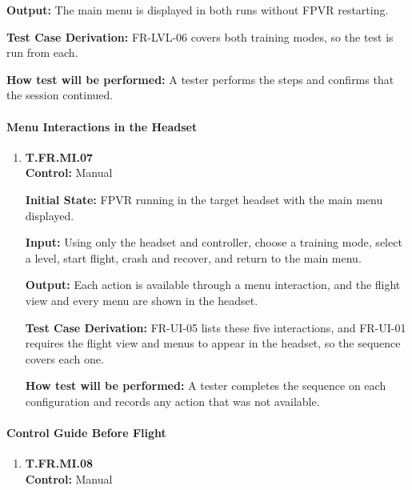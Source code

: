 \documentclass[12pt, titlepage]{article}
\begin{document}
{\begin{enumerate}
\textbf{Output:} The main menu is displayed in both runs without FPVR restarting.

\textbf{Test Case Derivation:} \mbox{FR-LVL-06} covers both training modes, so the test
is run from each.

\textbf{How test will be performed:} A tester performs the steps and confirms that the
session continued.

\end{enumerate}

\paragraph{Menu Interactions in the Headset}

\begin{enumerate}

\item{\hypertarget{test-fr-mi-07}{}\textbf{T.FR.MI.07}\\}
\textbf{Control:} Manual

\textbf{Initial State:} FPVR running in the target headset with the main menu displayed.

\textbf{Input:} Using only the headset and controller, choose a training mode, select a
level, start flight, crash and recover, and return to the main menu.

\textbf{Output:} Each action is available through a menu interaction, and the flight
view and every menu are shown in the headset.

\textbf{Test Case Derivation:} \mbox{FR-UI-05} lists these five interactions, and
\mbox{FR-UI-01} requires the flight view and menus to appear in the headset, so the
sequence covers each one.

\textbf{How test will be performed:} A tester completes the sequence on each
configuration and records any action that was not available.

\end{enumerate}

\paragraph{Control Guide Before Flight}

\begin{enumerate}

\item{\hypertarget{test-fr-mi-08}{}\textbf{T.FR.MI.08}\\}
\textbf{Control:} Manual


\end{enumerate}}
\end{document}
